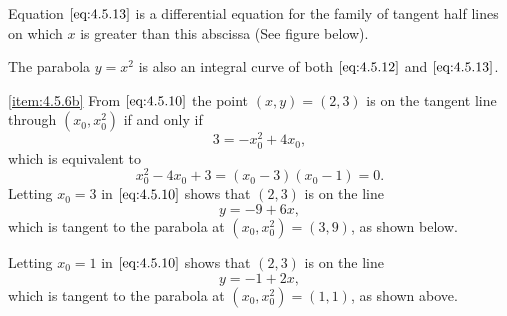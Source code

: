 \documentclass{ximera}
\begin{document}
\begin{example}
\begin{explanation}
\begin{center}
\end{center}
 
 
Equation $\eqref{eq:4.5.13}$ is a
differential
equation for the family of tangent half lines on which $x$ is greater
than this abscissa (See figure below).

\begin{center}
\end{center}

 
The
parabola $y=x^2$ is also an integral curve of both $\eqref{eq:4.5.12}$ and
$\eqref{eq:4.5.13}$.
 
\ref{item:4.5.6b}
From $\eqref{eq:4.5.10}$ the point $(x,y)=(2,3)$ is on the tangent line
through $(x_0,x_0^2)$ if and only if
$$
3=-x_0^2+4x_0,
$$
which is equivalent to
$$
x_0^2-4x_0+3=(x_0-3)(x_0-1)=0.
$$
Letting $x_0=3$ in $\eqref{eq:4.5.10}$ shows that $(2,3)$ is on the line
$$
y=-9+6x,
$$
which is tangent to the parabola at $(x_0,x_0^2)=(3,9)$, as shown below.

\begin{center}
\end{center}
 
 
 
Letting $x_0=1$ in $\eqref{eq:4.5.10}$ shows that $(2,3)$ is on the line
$$
y=-1+2x,
$$
which is tangent to the parabola at $(x_0,x_0^2)=(1,1)$, as shown above.
\end{explanation}
\end{example}
 
\end{document}

